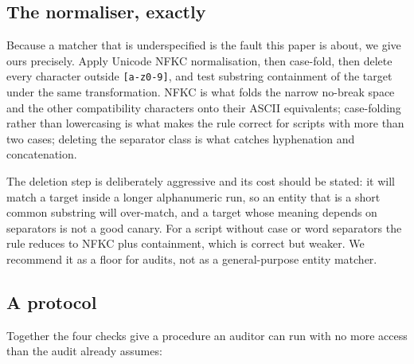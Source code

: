 \documentclass[journal]{IEEEtran}
\theoremstyle{definition}
\begin{document}
\subsection{The normaliser, exactly}
\label{sec:normspec}

Because a matcher that is underspecified is the fault this paper is about, we
give ours precisely. Apply Unicode NFKC normalisation, then case-fold, then
delete every character outside \texttt{[a-z0-9]}, and test substring containment
of the target under the same transformation. NFKC is what folds the narrow
no-break space and the other compatibility characters onto their ASCII
equivalents; case-folding rather than lowercasing is what makes the rule correct
for scripts with more than two cases; deleting the separator class is what
catches hyphenation and concatenation.

The deletion step is deliberately aggressive and its cost should be stated: it
will match a target inside a longer alphanumeric run, so an entity that is a
short common substring will over-match, and a target whose meaning depends on
separators is not a good canary. For a script without case or word separators
the rule reduces to NFKC plus containment, which is correct but weaker. We
recommend it as a floor for audits, not as a general-purpose entity matcher.

\subsection{A protocol}

Together the four checks give a procedure an auditor can run with no more access
than the audit already assumes:
\end{document}
